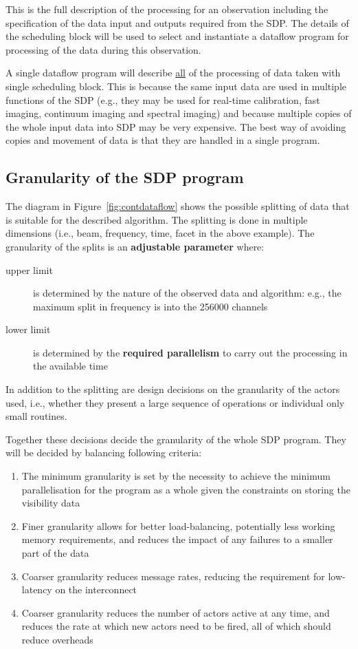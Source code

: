 \documentclass[11pt,a4paper]{article}
\begin{document}
This is the full description of the processing for an observation
including the specification of the data input and outputs required
from the SDP. The details of the scheduling block will be used to
select and instantiate a dataflow program for processing of the data
during this observation.

A single dataflow program will describe \underline{all} of the
processing of data taken with single scheduling block. This is because
the same input data are used in multiple functions of the SDP (e.g.,
they may be used for real-time calibration, fast imaging, continuum
imaging and spectral imaging) and because multiple copies of the whole
input data into SDP may be very expensive. The best way of avoiding
copies and movement of data is that they are handled in a single
program.

\subsection{Granularity of the SDP program}

The diagram in Figure~\ref{fig:contdataflow} shows the possible
splitting of data that is suitable for the described algorithm.  The
splitting is done in multiple dimensions (i.e., beam, frequency, time,
facet in the above example). The granularity of the splits is an {\bf
  adjustable parameter} where:
\begin{description}
\item[upper limit] is determined by the nature of the observed data
  and algorithm: e.g., the maximum split in frequency is into the
  256000 channels
\item[lower limit] is determined by the {\bf required parallelism} to
  carry out the processing in the available time
\end{description} 

In addition to the splitting are design decisions on the granularity
of the actors used, i.e., whether they present a large sequence of
operations or individual only small routines. 

Together these decisions decide the granularity of the whole SDP
program. They will be decided by balancing following criteria:
\begin{enumerate}
\item The minimum granularity is set by the necessity to achieve the
  minimum parallelisation for the program as a whole given the
  constraints on storing the visibility data
\item Finer granularity allows for better load-balancing, potentially
  less working memory requirements, and reduces the impact of any
  failures to a smaller part of the data
\item Coarser granularity reduces message rates, reducing the
  requirement for low-latency on the interconnect
\item Coarser granularity reduces the number of actors active at any
  time, and reduces the rate at which new actors need to be fired, all
  of which should reduce overheads
\end{enumerate}
\end{document}

